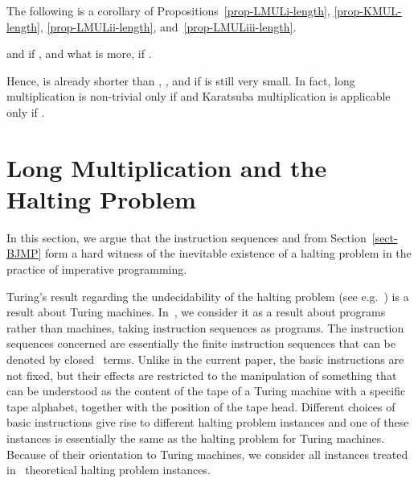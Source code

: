 \documentclass{llncs}
\begin{document}
The following is a corollary of Propositions~\ref{prop-LMULi-length}, 
\ref{prop-KMUL-length}, \ref{prop-LMULii-length}, 
and~\ref{prop-LMULiii-length}.
\begin{corollary}
 and
 if , and what is more, 
 if .
\end{corollary}
Hence,  is already shorter than , , 
and  if  is still very small.
In fact, long multiplication is non-trivial only if  and 
Karatsuba multiplication is applicable only if .

\section{Long Multiplication and the Halting Problem}
\label{sect-HP}

In this section, we argue that the instruction sequences  
and  from Section~\ref{sect-BJMP} form a hard witness of 
the inevitable existence of a halting problem in the practice of 
imperative programming.

Turing's result regarding the undecidability of the halting problem 
(see e.g.~\cite{Tur37a}) is a result about Turing machines.
In~\cite{BM09k}, we consider it as a result about programs rather than 
machines, taking instruction sequences as programs.
The instruction sequences concerned are essentially the finite 
instruction sequences that can be denoted by closed \PGAbj\ terms.
Unlike in the current paper, the basic instructions are not fixed, but 
their effects are restricted to the manipulation of something that can 
be understood as the content of the tape of a Turing machine with a 
specific tape alphabet, together with the position of the tape head.
Different choices of basic instructions give rise to different halting 
problem instances and one of these instances is essentially the same as 
the halting problem for Turing machines.
Because of their orientation to Turing machines, we consider all 
instances treated in~\cite{BM09k} theoretical halting problem instances.
\end{document}

